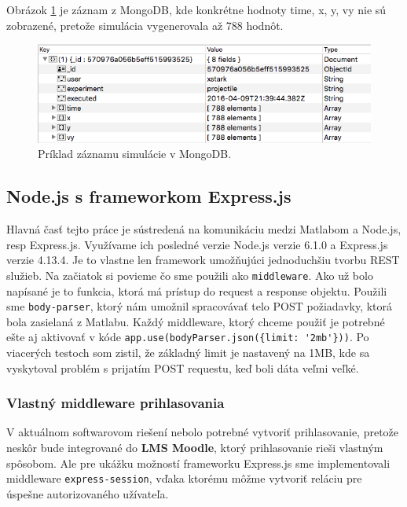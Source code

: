 Obrázok \ref{img-mongo-record} je záznam z MongoDB, kde konkrétne hodnoty time, x, y, vy nie sú zobrazené, pretože simulácia vygenerovala až 788 hodnôt.

\begin{figure}[H]
  \centering
  \includegraphics[scale=0.7]{img/code/mongodb-record.png}
  \caption{Príklad záznamu simulácie v MongoDB.}
  \label{img-mongo-record}
\end{figure}


\subsection{Node.js s frameworkom Express.js}
Hlavná časť tejto práce je sústredená na komunikáciu medzi Matlabom a Node.js, resp Express.js. Využívame ich posledné verzie Node.js verzie 6.1.0 a Express.js verzie 4.13.4. Je to vlastne len framework umožňujúci jednoduchšiu tvorbu REST služieb. Na začiatok si povieme čo sme použili ako \verb|middleware|. Ako už bolo napísané je to funkcia, ktorá má prístup do request a response objektu. Použili sme \verb|body-parser|, ktorý nám umožnil spracovávať telo POST požiadavky, ktorá bola zasielaná z Matlabu. Každý middleware, ktorý chceme použiť je potrebné ešte aj aktivovať v kóde \verb|app.use(bodyParser.json({limit: '2mb'}))|. Po viacerých testoch som zistil, že základný limit je nastavený na 1MB, kde sa vyskytoval problém s prijatím POST requestu, keď boli dáta veľmi veľké.

\subsubsection{Vlastný middleware prihlasovania}
V aktuálnom softwarovom riešení nebolo potrebné vytvoriť prihlasovanie, pretože neskôr bude integrované do \textbf{LMS Moodle}, ktorý prihlasovanie rieši vlastným spôsobom. Ale pre ukážku možností frameworku Express.js sme implementovali middleware \verb|express-session|, vďaka ktorému môžme vytvoriť reláciu pre úspešne autorizovaného užívateľa. 

